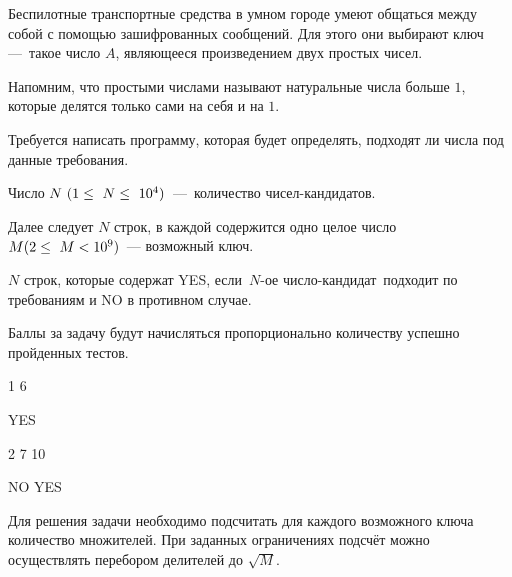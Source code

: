 
Беспилотные транспортные средства в умном городе умеют общаться между собой с помощью зашифрованных сообщений. Для этого они выбирают ключ — такое число $A$, являющееся произведением двух простых чисел.

Напомним, что простыми числами называют натуральные числа больше $1$, которые делятся только сами на себя и на $1$.

Требуется написать программу, которая будет определять, подходят ли числа под данные требования.


Число $N\space (1 \leq N \leq 10^4)$ — количество чисел-кандидатов.

Далее следует $N$ строк, в каждой содержится одно целое число $ M\space (2 \leq M < 10^9)$ — возможный ключ.

\outputfmtSection

$N$ строк, которые содержат YES, если $N$-ое число-кандидат подходит по требованиям и NO в противном случае.

\markSection

Баллы за задачу будут начисляться пропорционально количеству успешно пройденных тестов.


\begin{myverbbox}[\small]{\vinput}
    1
    6
\end{myverbbox}
\begin{myverbbox}[\small]{\voutput}
    YES
\end{myverbbox}


\begin{myverbbox}[\small]{\vinput}
    2
    7
    10
\end{myverbbox}
\begin{myverbbox}[\small]{\voutput}
    NO
    YES
\end{myverbbox}

\solutionSection

Для решения задачи необходимо подсчитать для каждого возможного ключа количество множителей. При заданных ограничениях подсчёт можно осуществлять перебором делителей до $\sqrt{M}$.

